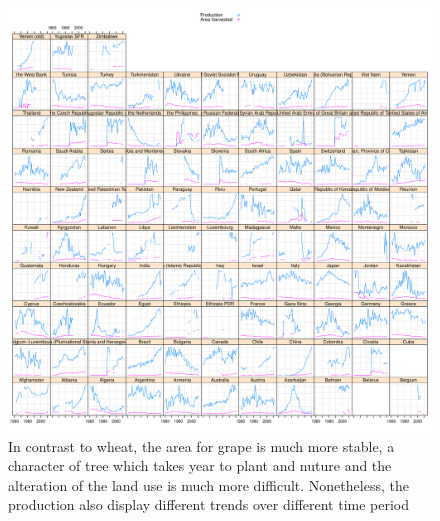 \documentclass[nojss]{jss}\usepackage[]{graphicx}\usepackage[]{color}
\makeatletter
\def\maxwidth{ %
  \ifdim\Gin@nat@width>\linewidth
    \linewidth
  \else
    \Gin@nat@width
  \fi
}
\newenvironment{knitrout}{}{} %
\makeatother
\begin{document}
\begin{knitrout}
\color{fgcolor}\begin{figure}[!ht]


{\centering \includegraphics[width=\maxwidth]{figure/grape-production-area-explore} 

}

\caption[In contrast to wheat, the area for grape is much more stable, a character of tree which takes year to plant and nuture and the alteration of the land use is much more difficult]{In contrast to wheat, the area for grape is much more stable, a character of tree which takes year to plant and nuture and the alteration of the land use is much more difficult. Nonetheless, the production also display different trends over different time period\label{fig:grape-production-area-explore}}
\end{figure}


\end{knitrout}
\end{document}
